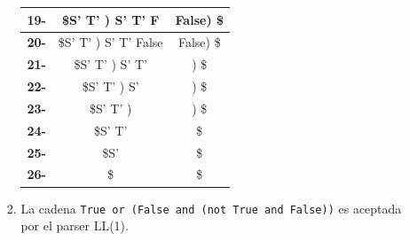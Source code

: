 \documentclass[12pt, letterpaper]{article}
\begin{document}
\begin{enumerate}
\begin{enumerate}[label=(\alph*)]
\begin{enumerate}[label=(\alph*)]
\begin{table}[H]
\begin{tabular}{|c|c|c|}
        \textbf{19-} & \$S' T' ) S' T' F     & False) \$                        \\ \hline
        \textbf{20-} & \$S' T' ) S' T' False & False) \$                        \\ \hline
        \textbf{21-} & \$S' T' ) S' T'       & ) \$                             \\ \hline
        \textbf{22-} & \$S' T' ) S'          & ) \$                             \\ \hline
        \textbf{23-} & \$S' T' )             & ) \$                             \\ \hline
        \textbf{24-} & \$S' T'               & \$                               \\ \hline
        \textbf{25-} & \$S'                  & \$                               \\ \hline
        \textbf{26-} & \$                    & \$                               \\ \hline
      \end{tabular}
    \end{table}
  \item La cadena \texttt{True or (False and (not True and False))} es aceptada por el parser LL(1).
    

\end{enumerate}
\end{enumerate}
\end{enumerate}
\end{document}
